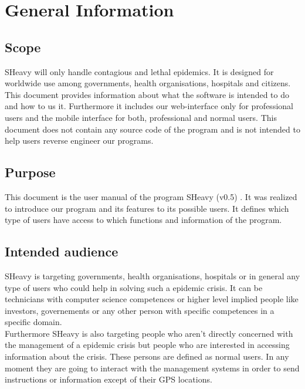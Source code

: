 \chapter{General Information}

\label{chap:introduction}

\section{Scope}
SHeavy will only handle contagious and lethal epidemics. It is designed for
worldwide use among governments, health organisations, hospitals and citizens.
This document provides information about what the software is intended to do and how to us it.
Furthermore it includes our web-interface only for professional users and the
mobile interface for both, professional and normal users. This document does not
contain any source code of the program and is not intended to help users reverse
engineer our programs.\\

\section{Purpose}
This document is the user manual of the program SHeavy (v0.5) . It was
realized to introduce our program and its features to its possible users. It
defines which type of users have access to which functions and information of the program.\\

\section{Intended audience}
SHeavy is targeting governments, health organisations, hospitals or in general
any type of users who could help in solving such a epidemic crisis. It can be
technicians with computer science competences or higher level implied people 
like investors, governements or any other person with specific competences in a
specific domain.\\

Furthermore SHeavy is also targeting people who aren't directly concerned with
the management of a epidemic crisis but people who are interested in accessing
information about the crisis. These persons are defined as normal users. In any
moment they are going to interact with the management systems in order to send
instructions or information except of their GPS locations.\\

